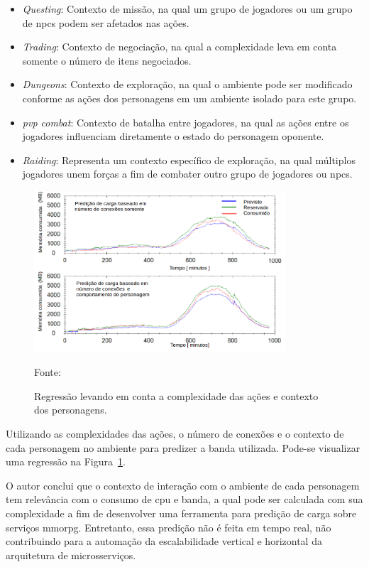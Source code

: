 \begin{itemize}
  \item \textit{Questing}: Contexto de missão, na qual um grupo de jogadores ou um grupo de \acp{npc} podem ser afetados nas ações.
  \item \textit{Trading}: Contexto de negociação, na qual a complexidade leva em conta somente o número de itens negociados.
  \item \textit{Dungeons}: Contexto de exploração, na qual o ambiente pode ser modificado conforme as ações dos personagens em um ambiente isolado para este grupo.
  \item \textit{\ac{pvp} combat}: Contexto de batalha entre jogadores, na qual as ações entre os jogadores influenciam diretamente o estado do personagem oponente.
  \item \textit{Raiding}: Representa um contexto específico de exploração, na qual múltiplos jogadores unem forças a fim de combater outro grupo de jogadores ou \acp{npc}.
\end{itemize}


\begin{figure}[htb!]
\caption{Regressão levando em conta a complexidade das ações e contexto dos personagens.}
\label{fig:regressao_complexidade}
\includegraphics[height=6.0cm]{img/cap2/network_regressao_complexidade.png}
\centering

Fonte:~\cite{6374456}
\end{figure}


Utilizando as complexidades das ações, o número de conexões e o contexto de cada personagem no ambiente para predizer a banda utilizada.
%
Pode-se visualizar uma regressão na Figura~\ref{fig:regressao_complexidade}.



O autor conclui que o contexto de interação com o ambiente de cada personagem tem relevância com o consumo de \ac{cpu} e banda, a qual pode ser calculada com sua complexidade a fim de desenvolver uma ferramenta para predição de carga sobre serviços \ac{mmorpg}.
%
Entretanto, essa predição não é feita em tempo real, não contribuindo para a automação da escalabilidade vertical e horizontal da arquitetura de microsserviços.




